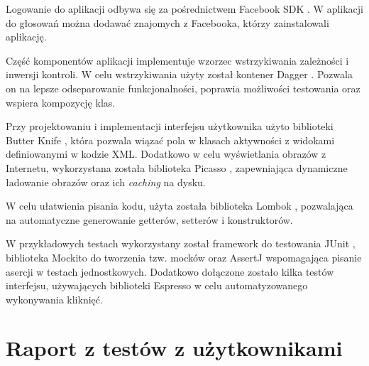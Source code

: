 \documentclass[10pt,a4paper]{article}
\begin{document}
Logowanie do aplikacji odbywa się za pośrednictwem Facebook SDK \cite{facebook-sdk}.
W aplikacji do głosowań można dodawać znajomych z Facebooka, którzy zainstalowali aplikację.

Część komponentów aplikacji implementuje wzorzec wstrzykiwania zależności i inwersji kontroli.
W celu wstrzykiwania użyty został kontener Dagger \cite{dagger}.
Pozwala on na lepsze odseparowanie funkcjonalności, poprawia możliwości testowania oraz wspiera
kompozycję klas.

Przy projektowaniu i implementacji interfejsu użytkownika użyto biblioteki Butter Knife
\cite{butterknife}, która pozwala wiązać pola w klasach aktywności z widokami definiowanymi
w kodzie XML.
Dodatkowo w celu wyświetlania obrazów z Internetu, wykorzystana została biblioteka Picasso
\cite{picasso}, zapewniająca dynamiczne ładowanie obrazów oraz ich \emph{caching} na dysku.

W celu ułatwienia pisania kodu, użyta została biblioteka Lombok \cite{lombok}, pozwalająca
na automatyczne generowanie getterów, setterów i konstruktorów.

W przykładowych testach wykorzystany został framework do testowania JUnit \cite{junit},
biblioteka Mockito \cite{mockito} do tworzenia tzw. mocków oraz AssertJ \cite{assertj} wspomagająca
pisanie asercji w testach jednostkowych.
Dodatkowo dołączone zostało kilka testów interfejsu, używających biblioteki Espresso \cite{espresso}
w celu automatyzowanego wykonywania kliknięć.

\section{Raport z testów z użytkownikami}
\end{document}

